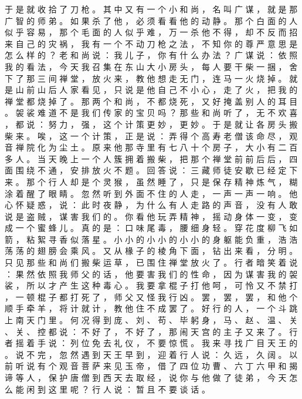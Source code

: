 {于 是 就 收 拾 了 刀 枪 。
其 中 又 有 一 个 小 和 尚 ， 名 叫 广 谋 ， 就 是 那 广 智 的 师 弟 。
如 果 杀 了 他 ， 必 须 看 看 他 的 动 静 。
那 个 白 面 的 人 似 乎 容 易 ， 那 个 毛 面 的 人 似 乎 难 ， 万 一 杀 他 不 得 ， 却 不 反 而 招 来 自 己 的 灾 祸 ， 我 有 一 个 不 动 刀 枪 之 法 ， 不 知 你 的 尊 严 意 思 是 怎 么 样 的 ？ 老 和 尚 说 ： 我 儿 子 ， 你 有 什 么 办 法 ？ 广 谋 说 ： 依 照 我 的 看 法 ， 今 天 我 召 集 在 东 山 大 小 房 头 ， 每 人 要 干 柴 一 捆 ， 舍 下 了 那 三 间 禅 堂 ， 放 火 来 ， 教 他 想 走 无 门 ， 连 马 一 火 烧 掉 。
就 是 山 前 山 后 人 家 看 见 ， 只 说 是 他 自 己 不 小 心 ， 走 了 火 ， 把 我 的 禅 堂 都 烧 掉 了 。
那 两 个 和 尚 ， 不 都 烧 死 ， 又 好 掩 盖 别 人 的 耳 目 。
袈 裟 难 道 不 是 我 们 传 家 的 宝 贝 吗 ？ 那 些 和 尚 听 了 ， 无 不 欢 喜 ， 都 说 ： 努 力 ， 强 ， 这 个 计 策 更 妙 ， 更 妙 。
于 是 就 让 各 房 头 搬 柴 来 。
唉 ， 这 一 个 计 策 ， 正 是 说 ： 弄 得 个 高 寿 老 僧 该 命 尽 ， 观 音 禅 院 化 为 尘 土 。
原 来 他 那 寺 里 有 七 八 十 个 房 子 ， 大 小 有 二 百 多 人 。
当 天 晚 上 一 个 人 簇 拥 着 搬 柴 ， 把 那 个 禅 堂 前 前 后 后 ， 四 面 围 绕 不 通 ， 安 排 放 火 不 题 。
回 答 说 ： 三 藏 师 徒 安 歇 已 经 定 下 来 。
那 个 行 人 却 是 个 灵 猴 ， 虽 然 睡 了 ， 只 是 保 存 精 神 炼 气 ， 糊 涂 着 醒 了 眼 睛 。
忽 然 听 到 外 面 不 住 的 人 走 ， 一 声 一 声 一 响 。
他 心 怀 疑 惑 ， 说 ： 此 时 夜 静 ， 为 什 么 有 人 走 路 的 声 音 ， 没 有 人 敢 说 是 盗 贼 ， 谋 害 我 们 的 。
你 看 他 玩 弄 精 神 ， 摇 动 身 体 一 变 ， 变 成 一 个 蜜 蜂 儿 。
真 的 是 ： 口 味 尾 毒 ， 腰 细 身 轻 。
穿 花 度 柳 飞 如 箭 ， 粘 絮 寻 香 似 落 星 。
小 小 的 小 小 的 小 小 的 身 躯 能 负 重 ， 浩 浩 荡 荡 的 翅 膀 会 乘 风 。
又 从 椽 子 的 棱 角 下 面 ， 钻 出 来 看 ， 分 明 。
只 见 那 些 和 尚 们 搬 柴 运 草 ， 已 围 住 禅 堂 放 火 了 。
行 者 暗 笑 着 说 ： 果 然 依 照 我 师 父 的 话 ， 他 要 害 我 们 的 性 命 ， 因 为 谋 害 我 的 袈 裟 ， 所 以 才 产 生 这 种 毒 心 。
我 要 拿 棍 子 打 他 呵 ， 可 怜 又 不 禁 打 ， 一 顿 棍 子 都 打 死 了 ， 师 父 又 怪 我 行 凶 。
罢 ， 罢 ， 罢 ， 和 他 个 顺 手 牵 羊 ， 将 计 就 计 ， 教 他 住 不 成 罢 了 。 好 行 的 人 ， 一 个 斗 跳 上 南 天 门 里 。
何 况 得 到 庞 、 刘 、 苟 、 毕 躬 身 ， 马 、 赵 、 温 、 关 、 关 、 控 都 说 ： 不 好 了 ， 不 好 了 ， 那 闹 天 宫 的 主 子 又 来 了 。
行 者 摇 着 手 说 ： 列 位 免 去 礼 仪 ， 不 要 惊 慌 。
我 来 寻 找 广 目 天 王 的 。
说 不 完 ， 忽 然 遇 到 天 王 早 到 ， 迎 着 行 人 说 ： 久 远 ， 久 阔 。
以 前 听 说 有 个 观 音 菩 萨 来 见 玉 帝 ， 借 了 四 位 功 曹 、 六 丁 六 甲 和 揭 谛 等 人 ， 保 护 唐 僧 到 西 天 去 取 经 ， 说 你 与 他 做 了 徒 弟 ， 今 天 怎 么 能 闲 到 这 里 呢 ？ 行 人 说 ： 暂 且 不 要 谈 话 。
}
